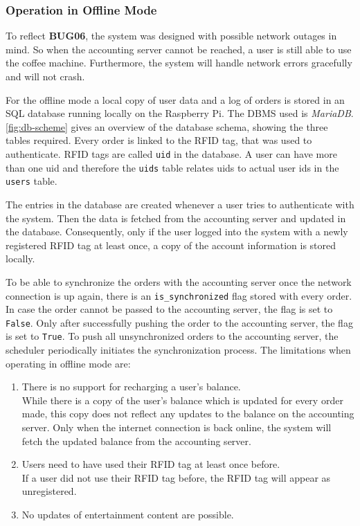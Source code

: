 \documentclass[12pt]{article}
\begin{document}

\subsubsection{Operation in Offline Mode}
\label{sec:offline-mode}

To reflect \textbf{BUG06}, the system was designed with possible network outages in mind.
So when the accounting server cannot be reached, a user is still able to use the coffee machine.
Furthermore, the system will handle network errors gracefully and will not crash.

For the offline mode a local copy of user data and a log of orders is stored in an SQL database running locally on the Raspberry Pi.
The DBMS used is \textit{MariaDB}.
\autoref{fig:db-scheme} gives an overview of the database schema, showing the three tables required.
Every order is linked to the RFID tag, that was used to authenticate.
RFID tags are called \texttt{uid} in the database.
A user can have more than one uid and therefore the \texttt{uids} table relates uids to actual user ids in the \texttt{users} table.

The entries in the database are created whenever a user tries to authenticate with the system.
Then the data is fetched from the accounting server and updated in the database.
Consequently, only if the user logged into the system with a newly registered RFID tag at least once, 
a copy of the account information is stored locally.

To be able to synchronize the orders with the accounting server once the network connection is up again,
there is an \texttt{is\_synchronized} flag stored with every order.
In case the order cannot be passed to the accounting server, the flag is set to \texttt{False}.
Only after successfully pushing the order to the accounting server, the flag is set to \texttt{True}.
To push all unsynchronized orders to the accounting server,
the scheduler periodically initiates the synchronization process.
The limitations when operating in offline mode are:

\begin{enumerate}
  \item There is no support for recharging a user's balance. \\
        While there is a copy of the user's balance which is updated for every order made,
        this copy does not reflect any updates to the balance on the accounting server.
        Only when the internet connection is back online, the system will fetch the updated balance from the accounting server.
  \item Users need to have used their RFID tag at least once before. \\
        If a user did not use their RFID tag before, the RFID tag will appear as unregistered.
  \item No updates of entertainment content are possible. 
\end{enumerate}
\end{document}
